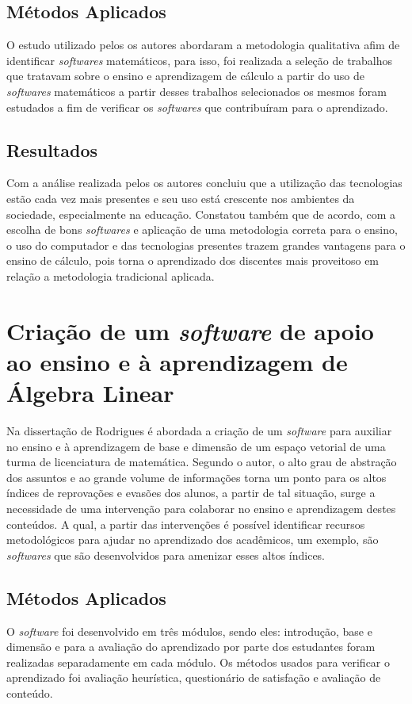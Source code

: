 \subsection{Métodos Aplicados}
\noindent O estudo utilizado pelos os autores abordaram a metodologia qualitativa afim de identificar \textit{softwares} matemáticos, para isso, foi realizada a seleção de trabalhos que tratavam sobre o ensino e aprendizagem de cálculo a partir do uso de \textit{softwares} matemáticos a partir desses trabalhos selecionados os mesmos foram estudados a fim de verificar os \textit{softwares} que contribuíram para o aprendizado.

\subsection{Resultados}
\noindent Com a análise realizada pelos os autores \cite{2016:Santana} concluiu que a utilização das tecnologias estão cada vez mais presentes e seu uso está crescente nos ambientes da sociedade, especialmente na educação. Constatou também que de acordo, com a escolha de bons \textit{softwares} e aplicação de uma metodologia correta para o ensino, o uso do computador e das tecnologias presentes trazem grandes vantagens para o ensino de cálculo, pois torna o aprendizado dos discentes mais proveitoso em relação a metodologia tradicional aplicada.  

\section{Criação de um \textit{software} de apoio ao ensino e à aprendizagem de Álgebra Linear}

\noindent Na dissertação de Rodrigues \cite{2009:Rodrigues} é abordada a criação de um \textit{software} para auxiliar no ensino e à aprendizagem de base e dimensão de um espaço vetorial de uma turma de licenciatura de matemática. Segundo o autor, o alto grau de abstração dos assuntos e ao grande volume de informações torna um ponto para os altos índices de reprovações e evasões dos alunos, a partir de tal situação, surge a necessidade de uma intervenção para colaborar no ensino e aprendizagem destes conteúdos. A qual, a partir das intervenções é possível identificar recursos metodológicos para ajudar no aprendizado dos acadêmicos, um exemplo, são \textit{softwares} que são desenvolvidos para amenizar esses altos índices.

\subsection{Métodos Aplicados}
\noindent O \textit{software} foi desenvolvido em três módulos, sendo eles: introdução, base e dimensão e para a avaliação do aprendizado por parte dos estudantes foram realizadas separadamente em cada módulo. Os métodos usados para verificar o aprendizado foi avaliação heurística, questionário de satisfação e avaliação de conteúdo.


